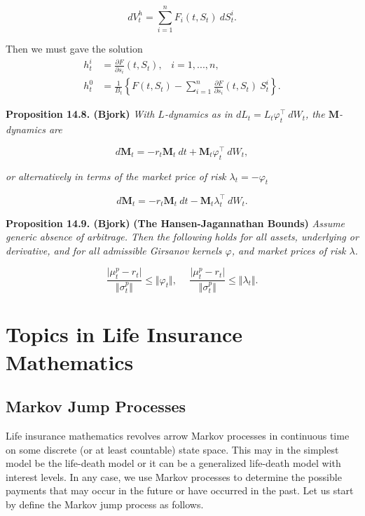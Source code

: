 \documentclass[a4paper,12pt,openany]{book}
\begin{document}
\[
dV_t^h=\sum_{i=1}^n F_i(t,S_t)\ dS_t^i.
\]

Then we must gave the solution
\begin{align*}
h_t^i&=\frac{\partial F}{\partial s_i}(t,S_t),\hspace{10pt}i=1,...,n,\tag{14.32}\\
h_t^0&=\frac{1}{B_t}\left\{F(t,S_t)-\sum_{i=1}^n \frac{\partial F}{\partial s_i}(t,S_t)\ S_t^i\right\}.\tag{14.33}
\end{align*}

\textbf{Proposition 14.8. (Bjork)} \emph{With \(L\)-dynamics as in \(dL_t=L_t\varphi^\top_t\ dW_t\), the \(\mathbf{M}\)-dynamics are}

\[
d\mathbf{M}_t=-r_t\mathbf{M}_t\ dt+\mathbf{M}_t\varphi_t^\top\ dW_t,\tag{14.39}
\]

\emph{or alternatively in terms of the market price of risk \(\lambda_t=-\varphi_t\)}

\[
d\mathbf{M}_t=-r_t\mathbf{M}_t\ dt-\mathbf{M}_t\lambda_t^\top\ dW_t.\tag{14.40}
\]

\textbf{Proposition 14.9. (Bjork)} \textbf{(The Hansen-Jagannathan Bounds)} \emph{Assume generic absence of arbitrage. Then the following holds for all assets, underlying or derivative, and for all admissible Girsanov kernels \(\varphi\), and market prices of risk \(\lambda\).}

\[
\frac{\vert \mu_t^p - r_t\vert}{\Vert \sigma_t ^p\Vert}\le \Vert \varphi_t\Vert,\hspace{15pt} \frac{\vert \mu_t^p - r_t\vert}{\Vert \sigma_t ^p\Vert}\le \Vert \lambda_t\Vert.\tag{14.42}
\]

\hypertarget{topics-in-life-insurance-mathematics}{%
\chapter{Topics in Life Insurance Mathematics}\label{topics-in-life-insurance-mathematics}}

\hypertarget{markov-jump-processes}{%
\section{Markov Jump Processes}\label{markov-jump-processes}}

Life insurance mathematics revolves arrow Markov processes in continuous time on some discrete (or at least countable) state space. This may in the simplest model be the life-death model or it can be a generalized life-death model with interest levels. In any case, we use Markov processes to determine the possible payments that may occur in the future or have occurred in the past. Let us start by define the Markov jump process as follows.
\end{document}
